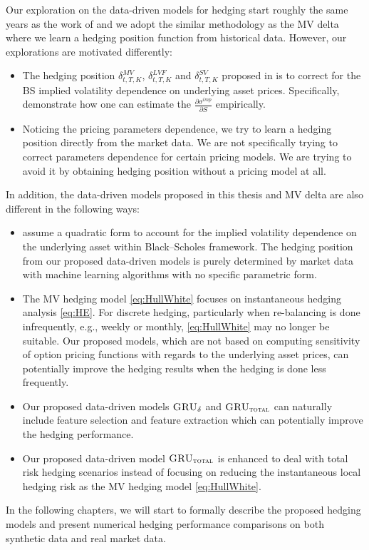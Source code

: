 \documentclass[letterpaper,12pt,titlepage,oneside,final]{book}
\numberwithin{equation}{section}
\theoremstyle{definition}
\newcommand{\model}{\textsc{GRU}_\delta}
\newcommand{\modelT}{\textsc{GRU}_{\textsc{total}}}
\begin{document}
Our exploration on the data-driven models for hedging start roughly the same years as the work of \cite{hulloptimal} and we adopt the similar methodology as the MV delta where we learn a hedging position function from historical data. However, our explorations are motivated differently:
\begin{itemize}
    \item The hedging position  $\delta^{MV}_{t,T,K}$, $\delta^{LVF}_{t,T,K}$ and $\delta^{SV}_{t,T,K}$ proposed in \cite{hulloptimal} is to correct for the BS implied volatility dependence on underlying asset prices. Specifically, \citet{hulloptimal} demonstrate how one can estimate the $\frac{\partial \sigma^{imp}}{\partial S}$ empirically.
    \item Noticing the pricing parameters dependence, we try to learn a hedging position directly from the market data.  We are not specifically trying to correct  parameters dependence for certain pricing models. We are trying to avoid it  by obtaining hedging position without a pricing model at all.
\end{itemize}
In addition, the data-driven models proposed in this thesis and MV delta are also different in the following ways:
\begin{itemize}
    \item \citet{hulloptimal} assume a quadratic form to account for the implied volatility dependence on the underlying asset within Black–Scholes framework.  The hedging position from our proposed data-driven models is  purely determined by market data with machine learning algorithms with no specific parametric form.
    \item The MV hedging model \eqref{eq:HullWhite} focuses on instantaneous hedging analysis  \eqref{eq:HE}. For discrete hedging, particularly when re-balancing is done infrequently, e.g., weekly or monthly, \eqref{eq:HullWhite}   may no longer be suitable. Our proposed models, which are not based on computing sensitivity of option pricing functions with regards to the underlying asset prices, can potentially improve the hedging results when the hedging is done less frequently.
    \item Our proposed data-driven models $\model$ and $\modelT$ can naturally include feature selection and feature extraction which can potentially improve the hedging performance.
    \item Our proposed data-driven model $\modelT$ is enhanced to deal with total risk hedging scenarios instead of focusing on reducing the instantaneous local hedging risk as the   MV hedging model \eqref{eq:HullWhite}.
\end{itemize}
In the following chapters, we will start to formally describe the proposed hedging models and present numerical hedging performance comparisons on both synthetic data and real market data.
\end{document}
